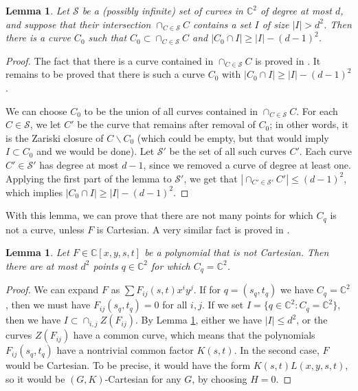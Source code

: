 \documentclass{daj}
\newtheorem{lemma}[theorem]{Lemma}
\theoremstyle{definition}
\newcommand{\C}{\mathbb C}
\begin{document}
\begin{lemma}%
\label{lem:bezoutmany}
Let $\mathcal{S}$ be a (possibly infinite) set of curves in $\C^2$ of degree at most $d$, 
and suppose that their intersection $\cap_{C\in \mathcal{S}} C$ contains a set $I$ of size $|I|>d^2$.
Then there is a curve $C_0$ such that $C_0\subset \cap_{C\in \mathcal{S}} C$ and $|C_0\cap I|\geq |I|-(d-1)^2$.
\end{lemma}
\begin{proof}
The fact that there is a curve contained in $\cap_{C\in \mathcal{S}} C$ is proved in \cite[Lemma 3.10]{RSZ}.
It remains to be proved that there is such a curve  $C_0$ with $|C_0\cap I|\geq |I|-(d-1)^2$.

We can choose $C_0$ to be the union of all curves contained in $\cap_{C\in \mathcal{S}} C$.
For each $C\in \mathcal{S}$, we let $C'$ be the curve that remains after removal of $C_0$; in other words, it is the Zariski closure of $C\backslash C_0$ (which could be empty, but that would imply $I\subset C_0$ and we would be done).
Let $\mathcal{S}'$ be the set of all such curves $C'$.
Each curve $C'\in \mathcal{S}'$ has degree at most $d-1$, since we removed a curve of degree at least one.
Applying the first part of the lemma to $\mathcal{S}'$, 
we get that $|\cap_{C'\in \mathcal{S}'}C'| \leq (d-1)^2$, 
which implies $|C_0\cap I|\geq |I|-(d-1)^2$.
\end{proof}

With this lemma, we can prove that there are not many points for which $C_q$ is not a curve, unless $F$ is Cartesian.
A very similar fact is proved in \cite{RSZ15}.

\begin{lemma}\label{lem:degenerate}
Let $F\in \C[x,y,s,t]$ be a polynomial that is not Cartesian.
Then there are at most $d^2$ points $q\in \C^2$ for which $C_q = \C^2$.
\end{lemma}
\begin{proof}
We can expand $F$ as $\sum F_{ij}(s,t)x^iy^j$.
If for $q = (s_q,t_q)$ we have $C_q=\C^2$, then we must have $F_{ij}(s_q,t_q) = 0$ for all $i,j$.
If we set $I = \{q\in \C^2: C_q = \C^2\}$,
then we have $I\subset \cap_{i,j} Z(F_{ij})$.
By Lemma \ref{lem:bezoutmany},
either we have $|I|\leq d^2$, 
or the curves $Z(F_{ij})$ have a common curve, 
which means that the polynomials $F_{ij}(s_q,t_q)$ have a nontrivial common factor $K(s,t)$.
In the second case, $F$ would be Cartesian. 
To be precise, it would have the form $K(s,t)L(x,y,s,t)$, 
so it would be $(G,K)$-Cartesian for any $G$, by choosing $H=0$.
\end{proof}
\end{document}
